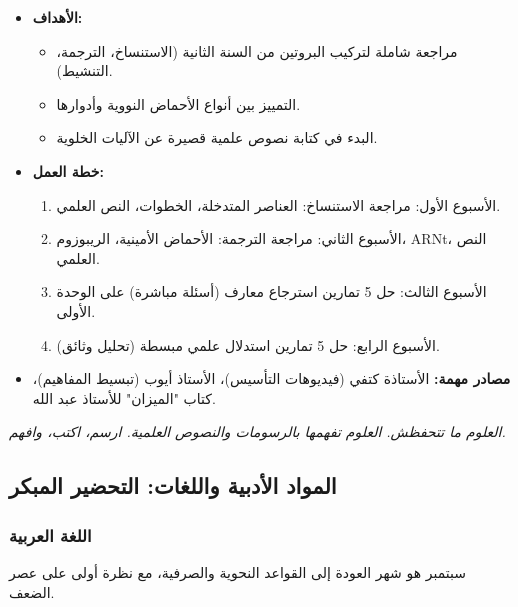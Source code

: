 \documentclass[12pt,a4paper]{book}
\newcommand{\quoteAr}[1]{%
	\begin{myquote}
		\itshape #1
	\end{myquote}
}
\begin{document}
	\begin{itemize}
		\item \textbf{الأهداف:}
		\begin{itemize}
			\item مراجعة شاملة لتركيب البروتين من السنة الثانية (الاستنساخ، الترجمة، التنشيط).
			\item التمييز بين أنواع الأحماض النووية وأدوارها.
			\item البدء في كتابة نصوص علمية قصيرة عن الآليات الخلوية.
		\end{itemize}
		\item \textbf{خطة العمل:}
		\begin{enumerate}
			\item الأسبوع الأول: مراجعة الاستنساخ: العناصر المتدخلة، الخطوات، النص العلمي.
			\item الأسبوع الثاني: مراجعة الترجمة: الأحماض الأمينية، الريبوزوم، ARNt، النص العلمي.
			\item الأسبوع الثالث: حل 5 تمارين استرجاع معارف (أسئلة مباشرة) على الوحدة الأولى.
			\item الأسبوع الرابع: حل 5 تمارين استدلال علمي مبسطة (تحليل وثائق).
		\end{enumerate}
		\item \textbf{مصادر مهمة:} الأستاذة كتفي (فيديوهات التأسيس)، الأستاذ أيوب (تبسيط المفاهيم)، كتاب "الميزان" للأستاذ عبد الله.
	\end{itemize}
	
	\quoteAr{العلوم ما تتحفظش. العلوم تفهمها بالرسومات والنصوص العلمية. ارسم، اكتب، وافهم.}
	
	\subsection{المواد الأدبية واللغات: التحضير المبكر}
	
	\subsubsection{اللغة العربية}
	
	سبتمبر هو شهر العودة إلى القواعد النحوية والصرفية، مع نظرة أولى على عصر الضعف.
	
\end{document}
